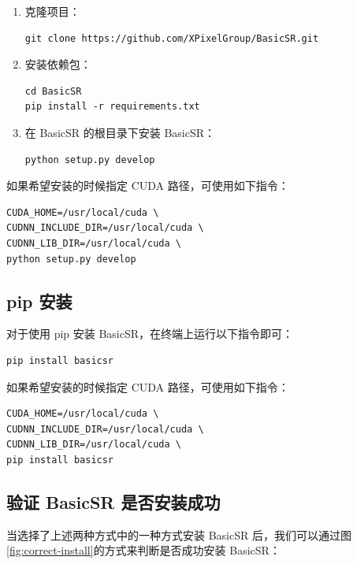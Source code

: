 \documentclass[../main.tex]{subfiles}
\begin{document}
\begin{enumerate}
    \item 克隆项目：
    \begin{verbatim}
git clone https://github.com/XPixelGroup/BasicSR.git
    \end{verbatim}

    \item 安装依赖包：
    \begin{verbatim}
cd BasicSR
pip install -r requirements.txt
    \end{verbatim}

    \item 在 BasicSR 的根目录下安装 BasicSR：
    \begin{verbatim}
python setup.py develop
    \end{verbatim}
\end{enumerate}

如果希望安装的时候指定 CUDA 路径，可使用如下指令：

\begin{verbatim}
CUDA_HOME=/usr/local/cuda \
CUDNN_INCLUDE_DIR=/usr/local/cuda \
CUDNN_LIB_DIR=/usr/local/cuda \
python setup.py develop

\end{verbatim}

\subsection{pip 安装}
\label{installation:pip-install}
对于使用 pip 安装 BasicSR，在终端上运行以下指令即可：
    \begin{verbatim}
pip install basicsr
    \end{verbatim}

如果希望安装的时候指定 CUDA 路径，可使用如下指令：

\begin{verbatim}
CUDA_HOME=/usr/local/cuda \
CUDNN_INCLUDE_DIR=/usr/local/cuda \
CUDNN_LIB_DIR=/usr/local/cuda \
pip install basicsr
\end{verbatim}

\subsection{验证 BasicSR 是否安装成功}

当选择了上述两种方式中的一种方式安装 BasicSR 后，我们可以通过图\ref{fig:correct-install}的方式来判断是否成功安装 BasicSR：
\end{document}
